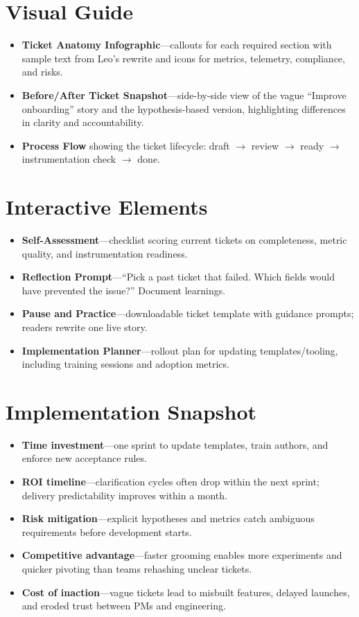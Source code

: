 \section{Visual Guide}
\label{sec:tickets-visuals}
\begin{itemize}
    \item \textbf{Ticket Anatomy Infographic}—callouts for each required section with sample text from Leo’s rewrite and icons for metrics, telemetry, compliance, and risks.
    \item \textbf{Before/After Ticket Snapshot}—side-by-side view of the vague ``Improve onboarding'' story and the hypothesis-based version, highlighting differences in clarity and accountability.
    \item \textbf{Process Flow} showing the ticket lifecycle: draft $\rightarrow$ review $\rightarrow$ ready $\rightarrow$ instrumentation check $\rightarrow$ done.
\end{itemize}

\section{Interactive Elements}
\label{sec:tickets-interactive}
\begin{itemize}
    \item \textbf{Self-Assessment}—checklist scoring current tickets on completeness, metric quality, and instrumentation readiness.
    \item \textbf{Reflection Prompt}—``Pick a past ticket that failed. Which fields would have prevented the issue?'' Document learnings.
    \item \textbf{Pause and Practice}—downloadable ticket template with guidance prompts; readers rewrite one live story.
    \item \textbf{Implementation Planner}—rollout plan for updating templates/tooling, including training sessions and adoption metrics.
\end{itemize}

\section{Implementation Snapshot}
\label{sec:tickets-snapshot}
\begin{itemize}
    \item \textbf{Time investment}—one sprint to update templates, train authors, and enforce new acceptance rules.
    \item \textbf{ROI timeline}—clarification cycles often drop within the next sprint; delivery predictability improves within a month.
    \item \textbf{Risk mitigation}—explicit hypotheses and metrics catch ambiguous requirements before development starts.
    \item \textbf{Competitive advantage}—faster grooming enables more experiments and quicker pivoting than teams rehashing unclear tickets.
    \item \textbf{Cost of inaction}—vague tickets lead to misbuilt features, delayed launches, and eroded trust between PMs and engineering.
\end{itemize}
